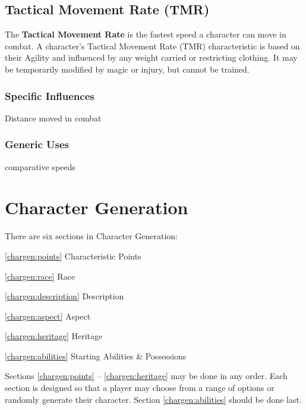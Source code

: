 \begin{multicols*}{3}
\subsection{Tactical Movement Rate (TMR)}

The \textbf{Tactical Movement Rate} is the fastest speed a character
can move in combat.  A character's Tactical Movement Rate (TMR)
characteristic is based on their Agility and influenced by any weight
carried or restricting clothing.  It may be temporarily modified by
magic or injury, but cannot be trained.
\subsubsection{Specific Influences}
\begin{Itemize}
\item Distance moved in combat
\end{Itemize}
\subsubsection{Generic Uses}
\begin{Itemize}
\item comparative speeds
\end{Itemize}

\newpage

\section{Character Generation}

There are six sections in Character Generation:
\begin{Description}
\item[\ref{chargen:points}] Characteristic Points
\item[\ref{chargen:race}] Race
\item[\ref{chargen:description}] Description
\item[\ref{chargen:aspect}]Aspect
\item[\ref{chargen:heritage}] Heritage
\item[\ref{chargen:abilities}] Starting Abilities \& Possessions
\end{Description}

Sections \ref{chargen:points} -- \ref{chargen:heritage} may be done
in any order. Each section is designed so that a player may choose
from a range of options or randomly generate their character. Section
\ref{chargen:abilities} should be done last.


\end{multicols*}
